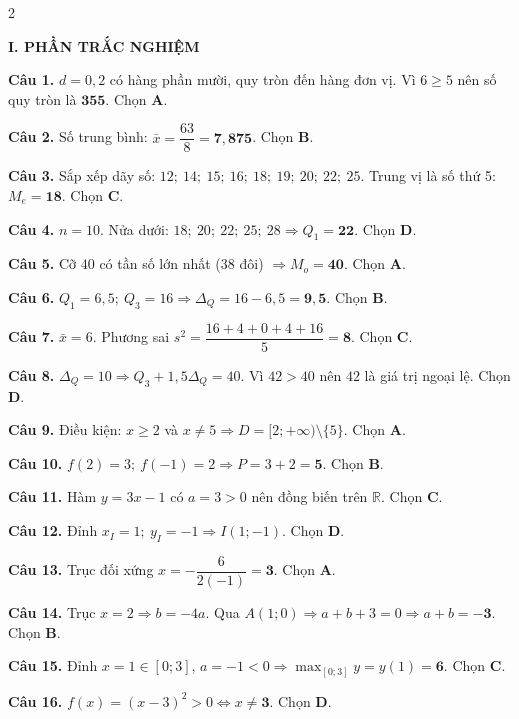 \documentclass[12pt,a4paper]{article}
\newcommand{\parttitle}[1]{\par\vspace{3.5pt}\needspace{3\baselineskip}{\large\bfseries\color{ink}#1}\par\nopagebreak\vspace{2pt}}
\begin{document}
\vspace{3pt}
\parttitle{HƯỚNG DẪN GIẢI CHI TIẾT}
\setlength{\columnsep}{16pt}
\begin{multicols}{2}
\small\sloppy

\textbf{\color{accent}I. PHẦN TRẮC NGHIỆM}

\textbf{Câu 1.} $d = 0{,}2$ có hàng phần mười, quy tròn đến hàng đơn vị. Vì $6 \ge 5$ nên số quy tròn là $\mathbf{355}$. Chọn \textbf{A}.

\textbf{Câu 2.} Số trung bình: $\bar{x} = \dfrac{63}{8} = \mathbf{7{,}875}$. Chọn \textbf{B}.

\textbf{Câu 3.} Sắp xếp dãy số: $12;\ 14;\ 15;\ 16;\ 18;\ 19;\ 20;\ 22;\ 25$. Trung vị là số thứ 5: $M_e = \mathbf{18}$. Chọn \textbf{C}.

\textbf{Câu 4.} $n = 10$. Nửa dưới: $18;\ 20;\ 22;\ 25;\ 28 \Rightarrow Q_1 = \mathbf{22}$. Chọn \textbf{D}.

\textbf{Câu 5.} Cỡ $40$ có tần số lớn nhất ($38$ đôi) $\Rightarrow M_o = \mathbf{40}$. Chọn \textbf{A}.

\textbf{Câu 6.} $Q_1 = 6{,}5;\ Q_3 = 16 \Rightarrow \Delta_Q = 16 - 6{,}5 = \mathbf{9{,}5}$. Chọn \textbf{B}.

\textbf{Câu 7.} $\bar{x} = 6$. Phương sai $s^2 = \dfrac{16+4+0+4+16}{5} = \mathbf{8}$. Chọn \textbf{C}.

\textbf{Câu 8.} $\Delta_Q = 10 \Rightarrow Q_3 + 1{,}5\Delta_Q = 40$. Vì $42 > 40$ nên $42$ là giá trị ngoại lệ. Chọn \textbf{D}.

\textbf{Câu 9.} Điều kiện: $x \ge 2$ và $x \ne 5 \Rightarrow D = [2; +\infty) \setminus \{5\}$. Chọn \textbf{A}.

\textbf{Câu 10.} $f(2) = 3;\ f(-1) = 2 \Rightarrow P = 3 + 2 = \mathbf{5}$. Chọn \textbf{B}.

\textbf{Câu 11.} Hàm $y = 3x - 1$ có $a = 3 > 0$ nên đồng biến trên $\mathbb{R}$. Chọn \textbf{C}.

\textbf{Câu 12.} Đỉnh $x_I = 1;\ y_I = -1 \Rightarrow I(1; -1)$. Chọn \textbf{D}.

\textbf{Câu 13.} Trục đối xứng $x = -\dfrac{6}{2(-1)} = \mathbf{3}$. Chọn \textbf{A}.

\textbf{Câu 14.} Trục $x = 2 \Rightarrow b = -4a$. Qua $A(1; 0) \Rightarrow a + b + 3 = 0 \Rightarrow a + b = \mathbf{-3}$. Chọn \textbf{B}.

\textbf{Câu 15.} Đỉnh $x = 1 \in [0; 3]$, $a = -1 < 0 \Rightarrow \max_{[0; 3]} y = y(1) = \mathbf{6}$. Chọn \textbf{C}.

\textbf{Câu 16.} $f(x) = (x - 3)^2 > 0 \Leftrightarrow x \ne \mathbf{3}$. Chọn \textbf{D}.


\end{multicols}
\end{document}
